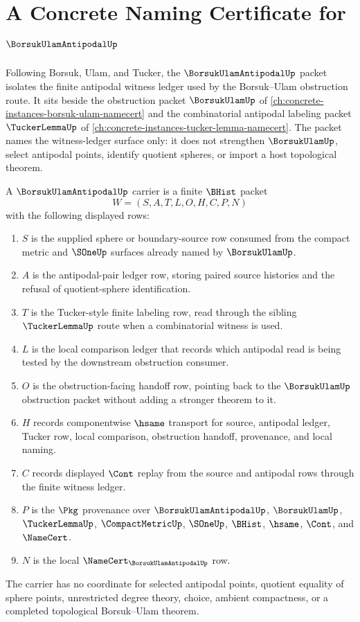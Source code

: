 \chapter{A Concrete Naming Certificate for $\BorsukUlamAntipodalUp$}
\label{ch:concrete-instances-borsuk-ulam-antipodal-namecert}

Following Borsuk, Ulam, and Tucker, the $\BorsukUlamAntipodalUp$ packet isolates the finite antipodal witness ledger used by the Borsuk--Ulam obstruction route. It sits beside the obstruction packet $\BorsukUlamUp$ of \autoref{ch:concrete-instances-borsuk-ulam-namecert} and the combinatorial antipodal labeling packet $\TuckerLemmaUp$ of \autoref{ch:concrete-instances-tucker-lemma-namecert}. The packet names the witness-ledger surface only: it does not strengthen $\BorsukUlamUp$, select antipodal points, identify quotient spheres, or import a host topological theorem.

\begin{definition}
\label{def:borsuk-ulam-antipodal-carrier}
A $\BorsukUlamAntipodalUp$ carrier is a finite $\BHist$ packet
$$
W=(S,A,T,L,O,H,C,P,N)
$$
with the following displayed rows:
\begin{enumerate}
\item $S$ is the supplied sphere or boundary-source row consumed from the compact metric and $\SOneUp$ surfaces already named by $\BorsukUlamUp$.
\item $A$ is the antipodal-pair ledger row, storing paired source histories and the refusal of quotient-sphere identification.
\item $T$ is the Tucker-style finite labeling row, read through the sibling $\TuckerLemmaUp$ route when a combinatorial witness is used.
\item $L$ is the local comparison ledger that records which antipodal read is being tested by the downstream obstruction consumer.
\item $O$ is the obstruction-facing handoff row, pointing back to the $\BorsukUlamUp$ obstruction packet without adding a stronger theorem to it.
\item $H$ records componentwise $\hsame$ transport for source, antipodal ledger, Tucker row, local comparison, obstruction handoff, provenance, and local naming.
\item $C$ records displayed $\Cont$ replay from the source and antipodal rows through the finite witness ledger.
\item $P$ is the $\Pkg$ provenance over $\BorsukUlamAntipodalUp$, $\BorsukUlamUp$, $\TuckerLemmaUp$, $\CompactMetricUp$, $\SOneUp$, $\BHist$, $\hsame$, $\Cont$, and $\NameCert$.
\item $N$ is the local $\NameCert_{\BorsukUlamAntipodalUp}$ row.
\end{enumerate}
The carrier has no coordinate for selected antipodal points, quotient equality of sphere points, unrestricted degree theory, choice, ambient compactness, or a completed topological Borsuk--Ulam theorem.
\end{definition}

